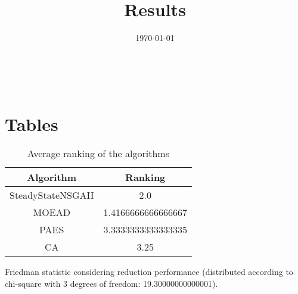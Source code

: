 \documentclass{article}
\title{Results}
\author{}
\date{\today}
\begin{document}
\oddsidemargin 0in \topmargin 0in\maketitle
\
\section{Tables}
\begin{table}[!htp]
\centering
\caption{Average ranking of the algorithms}
\begin{tabular}{c|c}
Algorithm&Ranking\\
\hline
SteadyStateNSGAII&2.0\\
MOEAD&1.4166666666666667\\
PAES&3.3333333333333335\\
CA&3.25\\
\end{tabular}
\end{table}


Friedman statistic considering reduction performance (distributed according to chi-square with 3 degrees of freedom: 19.30000000000001).
\end{document}
